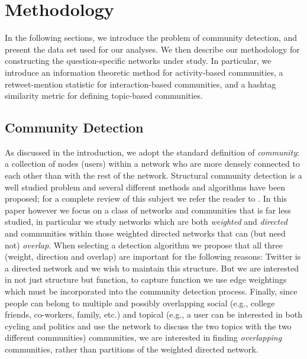 \section{Methodology}

In the following sections, we introduce the problem of community detection, and present the data set used for our analyses. We then describe our methodology for constructing the question-specific networks under study. In particular, we introduce an information theoretic method for activity-based communities, a retweet-mention statistic for interaction-based communities, and a hashtag similarity metric for defining topic-based communities.

\subsection{Community Detection}

As discussed in the introduction, we adopt the standard definition of \emph{community}: a collection of nodes (users) within a network who are more densely connected to each other than with the rest of the network. Structural community detection is a well studied problem and several different methods and algorithms have been proposed; for a complete review of this subject we refer the reader to \cite{fortunato2010community}. In this paper however we focus on a class of networks and communities that is far less studied, in particular we study networks which are both \textit{weighted} and \textit{directed} and communities within those weighted directed networks that can (but need not) \emph{overlap}. When selecting a detection algorithm we propose that all three (weight, direction and overlap) are important for the following reasons: Twitter is a directed network and we wish to maintain this structure. But we are interested in not just structure but function, to capture function we use edge weightings which must be incorporated into the community detection process. Finally, since people can belong to multiple and possibly overlapping social (e.g., college friends, co-workers, family, etc.) and topical (e.g., a user can be interested in both cycling and politics and use the network to discuss the two topics with the two different communities) communities, we are interested in finding \textit{overlapping} communities, rather than partitions of the weighted directed network. 

